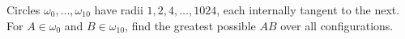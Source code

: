Circles $\omega_0,\ldots,\omega_{10}$ have radii $ 1,2,4,\ldots,1024 $, each internally tangent to the next. For $ A\in\omega_0 $ and $ B\in\omega_{10}$, find the greatest possible $ AB $ over all configurations.
